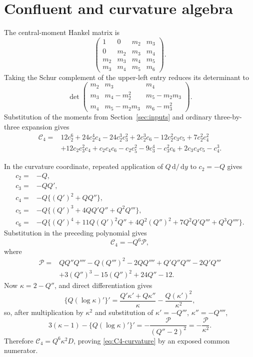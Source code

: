 \documentclass[11pt]{article}
\theoremstyle{remark}
\newcommand{\Cfour}{\mathcal{C}_4}
\newcommand{\dd}{\,\mathrm{d}}
\newcommand{\secref}[1]{Section~\ref{#1}}
\numberwithin{equation}{section}
\begin{document}
\appendix
\section{Confluent and curvature algebra}\label{app:algebra}

The central-moment Hankel matrix is
\[
 \begin{pmatrix}
 1&0&m_2&m_3\\
 0&m_2&m_3&m_4\\
 m_2&m_3&m_4&m_5\\
 m_3&m_4&m_5&m_6
 \end{pmatrix}.
\]
Taking the Schur complement of the upper-left entry reduces its determinant to
\[
 \det\begin{pmatrix}
 m_2&m_3&m_4\\
 m_3&m_4-m_2^2&m_5-m_2m_3\\
 m_4&m_5-m_2m_3&m_6-m_3^2
 \end{pmatrix}.
\]
Substitution of the moments from \secref{sec:inputs} and ordinary
three-by-three expansion gives
\begin{align}\label{eq:C4-expanded}
\Cfour={}&12c_2^6+24c_2^4c_4-24c_2^3c_3^2+2c_2^3c_6
-12c_2^2c_3c_5+7c_2^2c_4^2\\
&+12c_2c_3^2c_4+c_2c_4c_6-c_2c_5^2-9c_3^4-c_3^2c_6
+2c_3c_4c_5-c_4^3.
\end{align}

In the curvature coordinate, repeated application of
\(Q\dd/\dd y\) to \(c_2=-Q\) gives
\begin{align*}
c_2={}&-Q,\\
c_3={}&-QQ',\\
c_4={}&-Q\{(Q')^2+QQ''\},\\
c_5={}&-Q\{(Q')^3+4QQ'Q''+Q^2Q'''\},\\
c_6={}&-Q\{(Q')^4+11Q(Q')^2Q''+4Q^2(Q'')^2
 +7Q^2Q'Q'''+Q^3Q''''\}.
\end{align*}
Substitution in the preceding polynomial gives
\[
 \Cfour=-Q^6\mathcal P,
\]
where
\begin{align*}
\mathcal P={}&QQ''Q''''-Q(Q''')^2-2QQ''''+Q'Q''Q'''-2Q'Q'''\\
&+3(Q'')^3-15(Q'')^2+24Q''-12.
\end{align*}
Now \(\kappa=2-Q''\), and direct differentiation gives
\[
 \{Q(\log\kappa)'\}'
 =\frac{Q'\kappa'+Q\kappa''}{\kappa}
  -\frac{Q(\kappa')^2}{\kappa^2},
\]
so, after multiplication by \(\kappa^2\) and substitution of
\(\kappa'= -Q'''\), \(\kappa''=-Q''''\),
\[
 3(\kappa-1)-\{Q(\log\kappa)'\}'
 =-\frac{\mathcal P}{(Q''-2)^2}
 =-\frac{\mathcal P}{\kappa^2}.
\]
Therefore \(\Cfour=Q^6\kappa^2D\), proving
\eqref{eq:C4-curvature} by an exposed common numerator.
\end{document}

